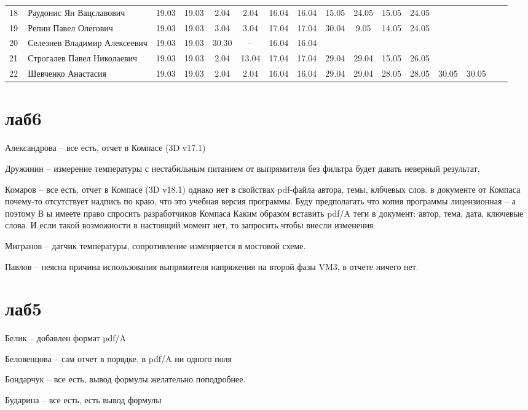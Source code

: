 \documentclass[a4paper,11pt]{article}
\begin{document}
\begin{tabular}{l|llccccccccccccc}
18\,&Раудонис Ян Вацславович        &19.03&19.03 &2.04&2.04   &16.04&16.04&15.05&24.05&15.05&24.05\\
19\,&Репин Павел Олегович           &19.03&19.03 &3.04&3.04   &17.04&17.04&30.04& 9.05&14.05&24.05\\
20\,&Селезнев Владимир Алексеевич   &19.03&19.03 &30.30&--    &16.04&16.04&&\\
\midrule
21\,&Строгалев Павел Николаевич     &19.03&19.03 &2.04&13.04  &17.04&17.04&29.04&29.04&15.05&26.05\\
22\,&Шевченко Анастасия             &19.03&19.03 &2.04&2.04   &16.04&16.04&29.04&29.04&28.05&28.05&30.05&30.05\\
\bottomrule
\end{tabular}

\newpage
{}
\recalctypearea
\section*{лаб6}
Александрова -- все есть, отчет в Компасе (3D v17.1)

Дружинин -- измерение температуры с нестабильным питанием от выпрямителя без фильтра будет давать неверный результат, 

Комаров  -- все есть, отчет в Компасе (3D v18.1) однако нет в свойствах pdf-файла автора, темы, клбчевых слов.
в документе от Компаса почему-то отсутствует надпись по краю, что это учебная версия программы.
Буду предполагать что копия программы лицензионная -- а поэтому В	ы имеете право спросить разработчиков Компаса
Каким образом вставить pdf/A теги в документ: автор, тема, дата, ключевые слова. 
И если такой возможности в настоящий момент нет, то запросить чтобы внесли изменения

Мигранов -- датчик температуры, сопротивление изменряется в мостовой схеме.

Павлов -- неясна причина использования выпрямителя напряжения на второй фазы VM3, в отчете ничего нет.

\section*{лаб5}

Белик -- добавлен формат pdf/A

Беловенцова -- сам отчет в порядке, в pdf/A ни одного поля

Бондарчук -- все есть, вывод формулы желательно поподробнее.

Бударина -- все есть, есть вывод формулы
\end{document}

